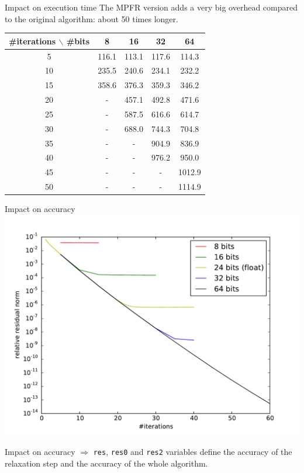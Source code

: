 \documentclass{beamer}
\begin{document}
\begin{frame}{Impact on execution time}
 The MPFR version adds a very big overhead compared to the original algorithm: about 50 times longer.
 \begin{tabular}{|c|c|c|c|c|}
  \hline
  \#iterations $\backslash$ \#bits & 8 & 16 & 32 & 64 \\
  \hline
  5 & 116.1 & 113.1 & 117.6 & 114.3\\
  \hline
  10 & 235.5 & 240.6 & 234.1 & 232.2\\
  \hline
  15 & 358.6 & 376.3 & 359.3 & 346.2\\
  \hline
  20 & - & 457.1 & 492.8 & 471.6 \\
  \hline
  25 & - & 587.5 & 616.6 & 614.7 \\
  \hline
  30 & - & 688.0 & 744.3 & 704.8 \\
  \hline
  35 & - & - & 904.9 & 836.9\\
  \hline
  40 & - & - & 976.2 & 950.0 \\
  \hline
  45 & - & - & - & 1012.9\\
  \hline
  50 & - & - & - & 1114.9\\
  \hline
 \end{tabular}

\end{frame}

\begin{frame}{Impact on accuracy}
  \includegraphics[width=\linewidth]{AMG2006/test/MPFR/bits_convergence.pdf}
\end{frame}

\begin{frame}[fragile]{Impact on accuracy}
  $\Rightarrow$ \texttt{res}, \texttt{res0} and \texttt{res2} variables define the accuracy of the relaxation step and the accuracy of the whole algorithm.
  \resizebox{0.8\linewidth}{!}{}
\end{frame}
\end{document}
